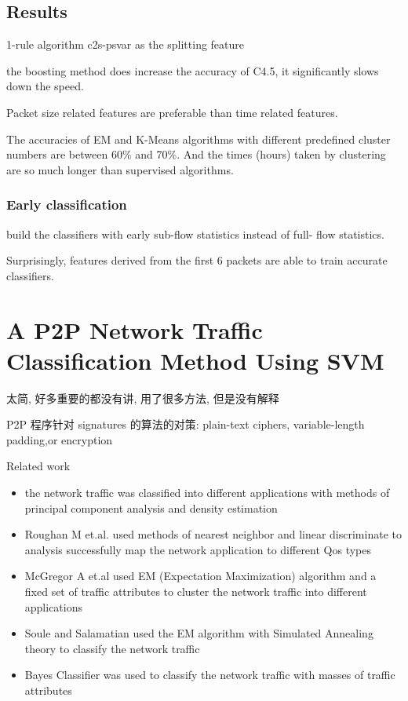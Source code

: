\documentclass{article}
\begin{document}
\subsection{Results}\label{results}
1-rule algorithm c2s-psvar as the splitting feature

the boosting method does increase the accuracy of C4.5, it significantly slows down the speed.

Packet size related features are preferable than time related features.

The accuracies of EM and K-Means algorithms with different predefined cluster numbers are between 60\% and 70\%. 
And the times (hours) taken by clustering are so much longer than supervised algorithms.

\subsubsection{Early classification}\label{early-classification}
build the classifiers with early sub-flow statistics instead of full- flow statistics.

Surprisingly, features derived from the first 6 packets are able to train accurate classifiers.

\section{A P2P Network Traffic Classification Method Using SVM}\label{a-p2p-network-traffic-classification-method-using-svm}
太简, 好多重要的都没有讲, 用了很多方法, 但是没有解释

P2P 程序针对 signatures 的算法的对策: plain-text ciphers, variable-length padding,or encryption

Related work
\begin{itemize}
\item the network traffic was classified into different applications with methods of principal component analysis and density estimation 
\item Roughan M et.al. used methods of nearest neighbor and linear discriminate to analysis successfully map the network application to different Qos types 
\item McGregor A et.al used EM (Expectation Maximization) algorithm and a fixed set of traffic attributes to cluster the network traffic into different applications 
\item Soule and Salamatian used the EM algorithm with Simulated Annealing theory to classify the network traffic 
\item Bayes Classifier was used to classify the network traffic with masses of traffic attributes
\end{itemize}
\end{document}

